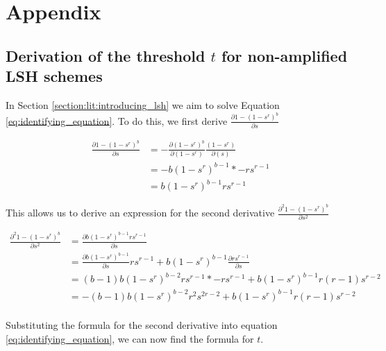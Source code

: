 \appendix
\chapter{Appendix}
\renewcommand\thesection{\Roman{section}}
\label{chap:appendix}
\section{Derivation of the threshold $t$ for non-amplified LSH schemes}
\label{appendix:derivation_threshold}
In Section \ref{section:lit:introducing_lsh} we aim to solve Equation \ref{eq:identifying_equation}. To do this, we first derive $\frac{\partial 1 - (1-s^r)^b}{\partial s}$

\begin{align*}
    \frac{\partial 1 - (1-s^r)^b}{\partial s} &= -\frac{\partial (1-s^r)^b}{\partial (1-s^r)} \frac{(1-s^r)}{\partial (s)}\\
                                &= - b(1-s^r)^{b -1 } * - rs^{r-1}\\
                                &= b(1-s^r)^{b -1 } rs^{r-1}
\end{align*}


This allows us to derive an expression for the second derivative $\frac{\partial^2 1 - (1-s^r)^b }{\partial s^2}$

\begin{align*}
    \frac{\partial^2 1 - (1-s^r)^b }{\partial s^2} &= \frac{\partial b(1-s^r)^{b -1 } rs^{r-1}}{\partial s} \\ 
                                    &= \frac{\partial b(1-s^r)^{b -1 } }{\partial s} rs^{r-1}  + b(1-s^r)^{b -1 } \frac{\partial rs^{r-1}}{\partial s} \\
                                    &= (b-1) b(1-s^r)^{b - 2 }rs^{r-1}  *  - rs^{r-1} + b(1-s^r)^{b -1 }  r(r-1)s^{r-2}\\
                                    &= - (b-1) b(1-s^r)^{b - 2 }r^2s^{2r-2} + b(1-s^r)^{b -1 }  r(r-1)s^{r-2}\\
\end{align*}

Substituting the formula for the second derivative into equation \ref{eq:identifying_equation}, we can now find the formula for $t$. 

